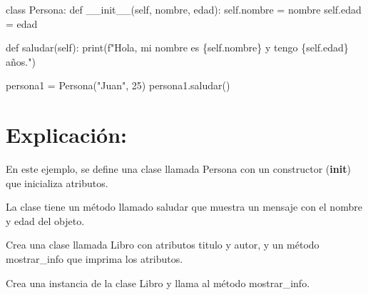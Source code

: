 \documentclass[
  a4paper,
  onepage,
  openany]{scrreprt}
\newenvironment{Shaded}{\begin{snugshade}}{\end{snugshade}}
\newcommand{\BuiltInTok}[1]{\textcolor[rgb]{0.00,0.23,0.31}{#1}}
\newcommand{\DecValTok}[1]{\textcolor[rgb]{0.68,0.00,0.00}{#1}}
\newcommand{\FunctionTok}[1]{\textcolor[rgb]{0.28,0.35,0.67}{#1}}
\newcommand{\KeywordTok}[1]{\textcolor[rgb]{0.00,0.23,0.31}{#1}}
\newcommand{\NormalTok}[1]{\textcolor[rgb]{0.00,0.23,0.31}{#1}}
\newcommand{\OperatorTok}[1]{\textcolor[rgb]{0.37,0.37,0.37}{#1}}
\newcommand{\SpecialCharTok}[1]{\textcolor[rgb]{0.37,0.37,0.37}{#1}}
\newcommand{\SpecialStringTok}[1]{\textcolor[rgb]{0.13,0.47,0.30}{#1}}
\newcommand{\StringTok}[1]{\textcolor[rgb]{0.13,0.47,0.30}{#1}}
\newcommand{\VariableTok}[1]{\textcolor[rgb]{0.07,0.07,0.07}{#1}}
\begin{document}
\begin{Shaded}
\begin{Highlighting}[]
\KeywordTok{class}\NormalTok{ Persona:}
    \KeywordTok{def} \FunctionTok{\_\_init\_\_}\NormalTok{(}\VariableTok{self}\NormalTok{, nombre, edad):}
        \VariableTok{self}\NormalTok{.nombre }\OperatorTok{=}\NormalTok{ nombre}
        \VariableTok{self}\NormalTok{.edad }\OperatorTok{=}\NormalTok{ edad}

    \KeywordTok{def}\NormalTok{ saludar(}\VariableTok{self}\NormalTok{):}
        \BuiltInTok{print}\NormalTok{(}\SpecialStringTok{f"Hola, mi nombre es }\SpecialCharTok{\{}\VariableTok{self}\SpecialCharTok{.}\NormalTok{nombre}\SpecialCharTok{\}}\SpecialStringTok{ y tengo }\SpecialCharTok{\{}\VariableTok{self}\SpecialCharTok{.}\NormalTok{edad}\SpecialCharTok{\}}\SpecialStringTok{ años."}\NormalTok{)}

\NormalTok{persona1 }\OperatorTok{=}\NormalTok{ Persona(}\StringTok{"Juan"}\NormalTok{, }\DecValTok{25}\NormalTok{)}
\NormalTok{persona1.saludar()}
\end{Highlighting}
\end{Shaded}

\hypertarget{explicaciuxf3n-48}{%
\section{Explicación:}\label{explicaciuxf3n-48}}

En este ejemplo, se define una clase llamada Persona con un constructor
(\textbf{init}) que inicializa atributos.

La clase tiene un método llamado saludar que muestra un mensaje con el
nombre y edad del objeto.

\begin{tcolorbox}[enhanced jigsaw, breakable, opacityback=0, toptitle=1mm, coltitle=black, toprule=.15mm, rightrule=.15mm, colframe=quarto-callout-important-color-frame, opacitybacktitle=0.6, arc=.35mm, title=\textcolor{quarto-callout-important-color}{\faExclamation}\hspace{0.5em}{Actividad Práctica:}, titlerule=0mm, colbacktitle=quarto-callout-important-color!10!white, bottomtitle=1mm, bottomrule=.15mm, colback=white, left=2mm, leftrule=.75mm]

Crea una clase llamada Libro con atributos titulo y autor, y un método
mostrar\_info que imprima los atributos.

Crea una instancia de la clase Libro y llama al método mostrar\_info.

\end{tcolorbox}
\end{document}
